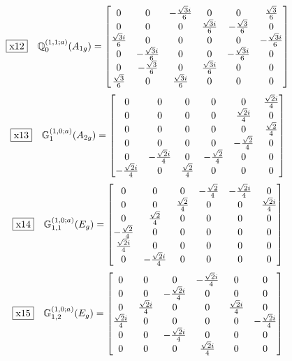 \documentclass[fleqn,10pt,landscape]{jsarticle}
\begin{document}
\begin{dmath*}
\fbox{x12}\quad \mathbb{Q}_{0}^{(1,1;a)}(A_{1g})=\begin{bmatrix} 0 & 0 & - \frac{\sqrt{3} i}{6} & 0 & 0 & \frac{\sqrt{3}}{6} \\ 0 & 0 & 0 & \frac{\sqrt{3} i}{6} & - \frac{\sqrt{3}}{6} & 0 \\ \frac{\sqrt{3} i}{6} & 0 & 0 & 0 & 0 & - \frac{\sqrt{3} i}{6} \\ 0 & - \frac{\sqrt{3} i}{6} & 0 & 0 & - \frac{\sqrt{3} i}{6} & 0 \\ 0 & - \frac{\sqrt{3}}{6} & 0 & \frac{\sqrt{3} i}{6} & 0 & 0 \\ \frac{\sqrt{3}}{6} & 0 & \frac{\sqrt{3} i}{6} & 0 & 0 & 0 \end{bmatrix}
\end{dmath*}
\begin{dmath*}
\fbox{x13}\quad \mathbb{G}_{1}^{(1,0;a)}(A_{2g})=\begin{bmatrix} 0 & 0 & 0 & 0 & 0 & \frac{\sqrt{2} i}{4} \\ 0 & 0 & 0 & 0 & \frac{\sqrt{2} i}{4} & 0 \\ 0 & 0 & 0 & 0 & 0 & \frac{\sqrt{2}}{4} \\ 0 & 0 & 0 & 0 & - \frac{\sqrt{2}}{4} & 0 \\ 0 & - \frac{\sqrt{2} i}{4} & 0 & - \frac{\sqrt{2}}{4} & 0 & 0 \\ - \frac{\sqrt{2} i}{4} & 0 & \frac{\sqrt{2}}{4} & 0 & 0 & 0 \end{bmatrix}
\end{dmath*}
\begin{dmath*}
\fbox{x14}\quad \mathbb{G}_{1,1}^{(1,0;a)}(E_{g})=\begin{bmatrix} 0 & 0 & 0 & - \frac{\sqrt{2}}{4} & - \frac{\sqrt{2} i}{4} & 0 \\ 0 & 0 & \frac{\sqrt{2}}{4} & 0 & 0 & \frac{\sqrt{2} i}{4} \\ 0 & \frac{\sqrt{2}}{4} & 0 & 0 & 0 & 0 \\ - \frac{\sqrt{2}}{4} & 0 & 0 & 0 & 0 & 0 \\ \frac{\sqrt{2} i}{4} & 0 & 0 & 0 & 0 & 0 \\ 0 & - \frac{\sqrt{2} i}{4} & 0 & 0 & 0 & 0 \end{bmatrix}
\end{dmath*}
\begin{dmath*}
\fbox{x15}\quad \mathbb{G}_{1,2}^{(1,0;a)}(E_{g})=\begin{bmatrix} 0 & 0 & 0 & - \frac{\sqrt{2} i}{4} & 0 & 0 \\ 0 & 0 & - \frac{\sqrt{2} i}{4} & 0 & 0 & 0 \\ 0 & \frac{\sqrt{2} i}{4} & 0 & 0 & \frac{\sqrt{2} i}{4} & 0 \\ \frac{\sqrt{2} i}{4} & 0 & 0 & 0 & 0 & - \frac{\sqrt{2} i}{4} \\ 0 & 0 & - \frac{\sqrt{2} i}{4} & 0 & 0 & 0 \\ 0 & 0 & 0 & \frac{\sqrt{2} i}{4} & 0 & 0 \end{bmatrix}
\end{dmath*}
\end{document}

